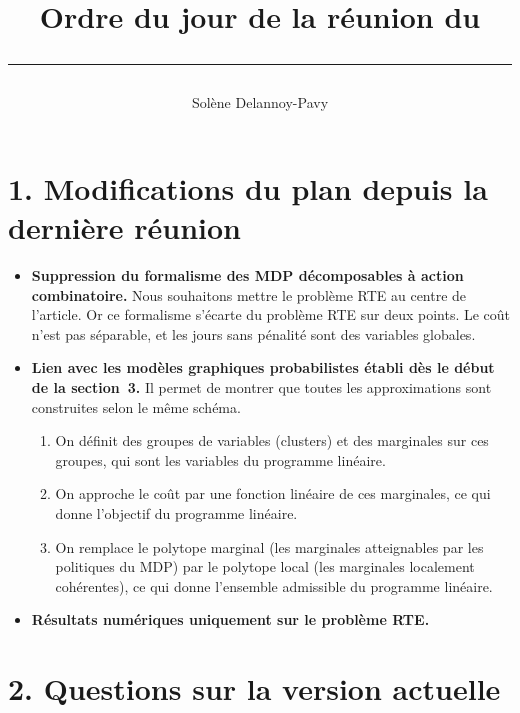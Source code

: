 \documentclass[11pt,a4paper]{article}
\title{Ordre du jour de la réunion du \rule{3cm}{0.4pt}}
\author{Solène Delannoy-Pavy}
\date{}
\begin{document}
\maketitle

\section*{1. Modifications du plan depuis la dernière réunion}

\begin{itemize}
\item \textbf{Suppression du formalisme des MDP décomposables à action combinatoire.} Nous souhaitons mettre le
problème RTE au centre de l'article. Or ce formalisme s'écarte du problème RTE sur deux points. Le coût n'est pas
séparable, et les jours sans pénalité sont des variables globales.
\item \textbf{Lien avec les modèles graphiques probabilistes établi dès le début de la section~3.} Il permet de
montrer que toutes les approximations sont construites selon le même schéma.
\begin{enumerate}
\item On définit des groupes de variables (clusters) et des marginales sur ces groupes, qui sont les variables du
programme linéaire.
\item On approche le coût par une fonction linéaire de ces marginales, ce qui donne l'objectif du programme linéaire.
\item On remplace le polytope marginal (les marginales atteignables par les politiques du MDP) par le polytope local
(les marginales localement cohérentes), ce qui donne l'ensemble admissible du programme linéaire.
\end{enumerate}
\item \textbf{Résultats numériques uniquement sur le problème RTE.}
\end{itemize}

\section*{2. Questions sur la version actuelle}
\end{document}
